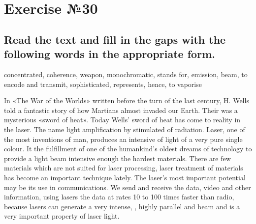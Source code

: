 \section{Exercise №30}
\subsection*{Read the text and fill in the gaps with the following words in the
      appropriate form.}
concentrated, coherence, weapon, monochromatic, stands for, emission, beam, to encode
and transmit, sophisticated, represents, hence, to vaporise

In «The War of the Worlds» written before the turn of the last century, H. Wells told
a fantastic story of how Martians almost invaded our Earth. Their 
\underline{\hspace{2cm}} was a mysterious «sword of heat». Today Wells’ sword of heat
has come to reality in the laser. The name \underline{\hspace{2cm}} light
amplification by stimulated \underline{\hspace{2cm}} of radiation. Laser,
one of the most  \underline{\hspace{2cm}} inventions of man, produces an
intensive \underline{\hspace{2cm}} of light of a very pure single colour.
It \underline{\hspace{2cm}} the fulfillment of one of the humankind’s
oldest dreams of technology to provide a light beam intensive enough 
\underline{\hspace{2cm}} the hardest materials. There are few materials which are not
suited for laser processing, \underline{\hspace{2cm}} laser treatment of
materials has become an important technique lately. The laser’s most important
potential may be its use in communications. We send and receive the data, video and
other information, using lasers \underline{\hspace{2cm}} the data at rates 10 to 100
times faster than radio, because lasers can generate a very intense, 
\underline{\hspace{2cm}}, highly parallel and \underline{\hspace{2cm}}
beam and \underline{\hspace{2cm}} is a very important property of laser light.

